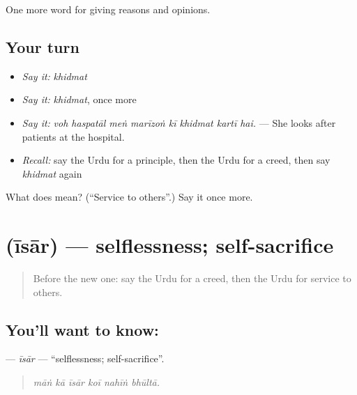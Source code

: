 \begin{grammarlens}[title={What you've built}]
One more word for giving reasons and opinions.
\end{grammarlens}

\subsection*{Your turn}
\begin{itemize}
\raggedright
  \item \emph{Say it:} \emph{khidmat}
  \item \emph{Say it:} \emph{khidmat}, once more
  \item \emph{Say it:} \emph{voh haspatāl meṅ marīzoṅ kī khidmat kartī hai.} — She looks after patients at the hospital.
  \item \emph{Recall:} say the Urdu for a principle, then the Urdu for a creed, then say \emph{khidmat} again
\end{itemize}

\begin{tcolorbox}[breakable,colback=teal!4,colframe=teal!35!black,title={Before you move on}]
What does  mean? (\textquotedblleft{}Service to others\textquotedblright{}.) Say it once more.
\end{tcolorbox}
\section[\texorpdfstring{\ur{ایثار} (īsār)}{ایثار (īsār)}]{ (īsār) — selflessness; self-sacrifice}

\label{lesson:UR-C346-isar}



\begin{quote}
Before the new one: say the Urdu for a creed, then the Urdu for service to others.
\end{quote}

\subsection*{You'll want to know: }
\textbf{} — \emph{īsār} — \textquotedblleft{}selflessness; self-sacrifice\textquotedblright{}.

\begin{quote}
     
\end{quote}

\begin{quote}
\emph{māṅ kā īsār koī nahīṅ bhūltā.}
\end{quote}

